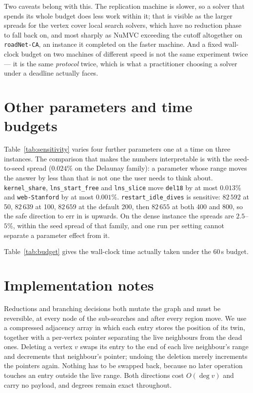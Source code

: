 \documentclass[preprint,authoryear,11pt]{elsarticle}
\theoremstyle{definition}
\begin{document}
Two caveats belong with this. The replication machine is slower, so a solver
that spends its whole budget does less work within it; that is visible as the
larger spreads for the vertex cover local search solvers, which have no
reduction phase to fall back on, and most sharply as NuMVC exceeding the cutoff
altogether on \texttt{roadNet-CA}, an instance it completed on the faster
machine. And a fixed wall-clock budget on two machines
of different speed is not the same experiment twice --- it is the same
\emph{protocol} twice, which is what a practitioner choosing a solver under a
deadline actually faces.




\section{Other parameters and time budgets}
Table~\ref{tab:sensitivity} varies four further parameters one at a time on three instances.
The comparison that makes the numbers interpretable is with the seed-to-seed spread
($0.024\%$ on the Delaunay family): a parameter whose range moves the answer by less than
that is not one the user needs to think about. \texttt{kernel\_share}, \texttt{lns\_start\_free}
and \texttt{lns\_slice} move \texttt{del18} by at most $0.013\%$ and \texttt{web-Stanford} by
at most $0.001\%$. \texttt{restart\_idle\_dives} is sensitive: $82\,592$ at 50, $82\,639$ at
100, $82\,659$ at the default 200, then $82\,655$ at both 400 and 800, so the safe direction
to err in is upwards. On the dense instance the spreads are $2.5$--$5\%$, within the seed
spread of that family, and one run per setting cannot separate a parameter effect from it.

Table~\ref{tab:budget} gives the wall-clock time actually taken under the 60\,s budget.


\section{Implementation notes}

\label{sec:implementation}

Reductions and branching decisions both mutate the graph and must be reversible,
at every node of the sub-searches and after every region move. We use a compressed
adjacency array in which each entry stores the position of its twin, together
with a per-vertex pointer separating the live neighbours from the dead ones.
Deleting a vertex $v$ swaps its entry to the end of each live neighbour's range
and decrements that neighbour's pointer; undoing the deletion merely increments
the pointers again. Nothing has to be swapped back, because no later operation
touches an entry outside the live range. Both directions cost $O(\deg v)$ and
carry no payload, and degrees remain exact throughout.
\end{document}
